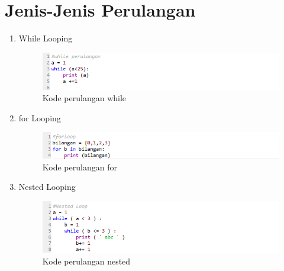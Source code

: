 \section{Jenis-Jenis Perulangan}
\begin{enumerate}
    \item While Looping
     \begin{figure}[!htbp]
        \centering
        \includegraphics[width=15cm]{figures/while.PNG}
        \caption{Kode perulangan while}
    \end{figure}
    \newpage
    \item for Looping
        \begin{figure}[!htbp]
        \centering
        \includegraphics[width=15cm]{figures/for.PNG}
        \caption{Kode perulangan for}
    \end{figure}
    \item Nested Looping
     \begin{figure}[!htbp]
        \centering
        \includegraphics[width=15cm]{figures/nested.PNG}
        \caption{Kode perulangan nested}
    \end{figure}
\end{enumerate}
